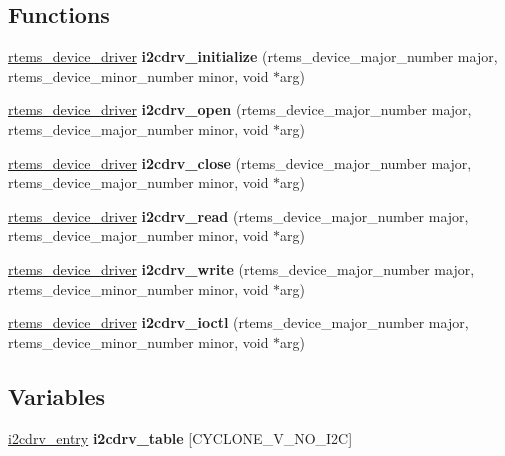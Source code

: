 \subsection*{Functions}
\begin{DoxyCompactItemize}
\item 
\mbox{\hyperlink{group__ClassicStatus_ga545d41846817eaba6143d52ee4d9e9fe}{rtems\+\_\+device\+\_\+driver}} {\bfseries i2cdrv\+\_\+initialize} (rtems\+\_\+device\+\_\+major\+\_\+number major, rtems\+\_\+device\+\_\+minor\+\_\+number minor, void $\ast$arg)
\item 
\mbox{\hyperlink{group__ClassicStatus_ga545d41846817eaba6143d52ee4d9e9fe}{rtems\+\_\+device\+\_\+driver}} {\bfseries i2cdrv\+\_\+open} (rtems\+\_\+device\+\_\+major\+\_\+number major, rtems\+\_\+device\+\_\+major\+\_\+number minor, void $\ast$arg)
\item 
\mbox{\hyperlink{group__ClassicStatus_ga545d41846817eaba6143d52ee4d9e9fe}{rtems\+\_\+device\+\_\+driver}} {\bfseries i2cdrv\+\_\+close} (rtems\+\_\+device\+\_\+major\+\_\+number major, rtems\+\_\+device\+\_\+major\+\_\+number minor, void $\ast$arg)
\item 
\mbox{\hyperlink{group__ClassicStatus_ga545d41846817eaba6143d52ee4d9e9fe}{rtems\+\_\+device\+\_\+driver}} {\bfseries i2cdrv\+\_\+read} (rtems\+\_\+device\+\_\+major\+\_\+number major, rtems\+\_\+device\+\_\+major\+\_\+number minor, void $\ast$arg)
\item 
\mbox{\hyperlink{group__ClassicStatus_ga545d41846817eaba6143d52ee4d9e9fe}{rtems\+\_\+device\+\_\+driver}} {\bfseries i2cdrv\+\_\+write} (rtems\+\_\+device\+\_\+major\+\_\+number major, rtems\+\_\+device\+\_\+minor\+\_\+number minor, void $\ast$arg)
\item 
\mbox{\hyperlink{group__ClassicStatus_ga545d41846817eaba6143d52ee4d9e9fe}{rtems\+\_\+device\+\_\+driver}} {\bfseries i2cdrv\+\_\+ioctl} (rtems\+\_\+device\+\_\+major\+\_\+number major, rtems\+\_\+device\+\_\+minor\+\_\+number minor, void $\ast$arg)
\end{DoxyCompactItemize}
\subsection*{Variables}
\begin{DoxyCompactItemize}
\item 
\mbox{\label{arm_2altera-cyclone-v_2i2c_2i2cdrv_8c_a99f5f9b0cd9b759344163113ec8b22ea}} 
\mbox{\hyperlink{structi2cdrv__entry}{i2cdrv\+\_\+entry}} {\bfseries i2cdrv\+\_\+table} \mbox{[}C\+Y\+C\+L\+O\+N\+E\+\_\+\+V\+\_\+\+N\+O\+\_\+\+I2C\mbox{]}
\end{DoxyCompactItemize}
